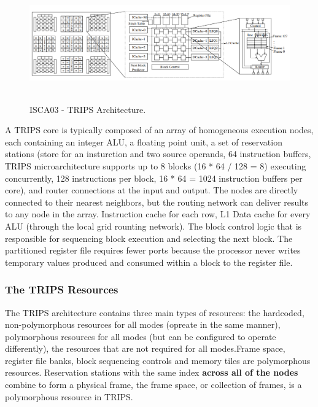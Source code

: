 \documentclass[UTF8,12pt,a4paper]{article}
\begin{document}
\begin{figure}[htb]
  \begin{small}
    \begin{center}
      \includegraphics[width=\textwidth,height=5cm]{figures/isca03_trips_arch.png}
    \end{center}
    \caption{ISCA03 - TRIPS Architecture.}
    \label{fig:trips_arch}
  \end{small}
\end{figure}

A TRIPS core is typically composed of an array of homogeneous execution nodes,
each containing an integer ALU, a floating point unit, a set of reservation stations
(store for an insturction and two source operands, 64 instruction buffers,
TRIPS microarchitecture supports up to 8 blocks (16 * 64 / 128 = 8) executing concurrently,
128 instructions per block, 16 * 64 = 1024 instruction buffers per core),
and router connections at the input and output.
The nodes are directly connected to their nearest neighbors,
but the routing network can deliver results to any node in the array.
Instruction cache for each row, L1 Data cache for every ALU (through the local grid rounting network).
The block control logic that is responsible for sequencing block execution and selecting the next block.
The partitioned register file requires fewer ports because the processor never
writes temporary values produced and consumed within a block to the register file.

\subsubsection{The TRIPS Resources}
The TRIPS architecture contains three main types of resources: 
the hardcoded, non-polymorphous resources for all modes (opreate in the same manner),
polymorphous resources for all modes (but can be configured to operate differently),
the resources that are not required for all modes.Frame space, register file banks,
block sequencing controls and memory tiles are polymorphous resources.
Reservation stations with the same index \textbf{across all of the nodes} combine to form a physical frame,
the frame space, or collection of frames, is a polymorphous resource in TRIPS.
\end{document}
